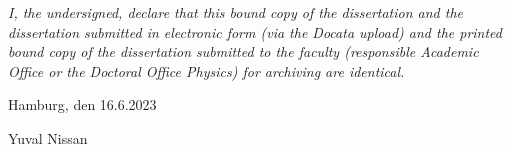 \emph{I, the undersigned, declare that this bound copy of the dissertation and the dissertation submitted in electronic form (via the Docata upload) and the printed bound copy of the dissertation submitted to the faculty (responsible Academic Office or the Doctoral Office Physics) for archiving are identical.}

\vspace{1cm}

Hamburg, den 16.6.2023

\vspace{3cm}

\hspace{8cm} \hdashrule{7cm}{1pt}{1pt}

\vspace{0.1cm}

\hspace{10.2cm} Yuval Nissan


